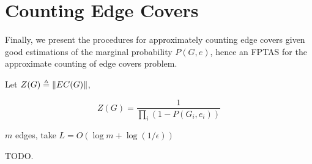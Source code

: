 \section{Counting Edge Covers}

Finally, we present the procedures for approximately counting edge covers given good estimations of the marginal probability $P(G,e)$, hence an FPTAS for the approximate counting of edge covers problem.

Let $Z(G) \triangleq \left\Vert EC(G)\right\Vert$,

\[ Z(G) = \frac{1}{\prod_i (1 - P(G_i, e_i))} \]

$m$ edges, 
take $L=O(\log m + \log(1/ \epsilon))$

TODO.

